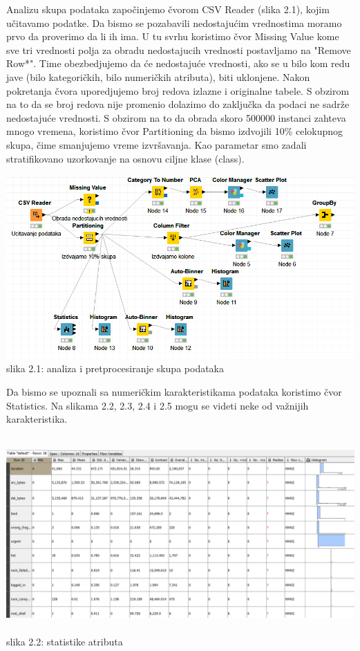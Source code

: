 \documentclass[10pt]{article}
\begin{document}
Analizu skupa podataka zapo\v cinjemo \v cvorom CSV Reader (slika 2.1), kojim u\v citavamo podatke. Da bismo se pozabavili nedostaju\' cim vrednostima moramo prvo da proverimo da li ih ima. U tu svrhu koristimo \v cvor Missing Value kome sve tri vrednosti polja za obradu nedostajucih vrednosti postavljamo na "Remove Row*". Time obezbedjujemo da \'ce nedostaju\' ce vrednosti, ako se u bilo kom redu jave (bilo kategori\v ckih, bilo numeri\v ckih atributa), biti uklonjene. Nakon pokretanja \v cvora uporedjujemo broj redova izlazne i originalne tabele. S obzirom na to da se broj redova nije promenio dolazimo do zaklju\v cka da podaci ne sadr\v ze nedostaju\' ce vrednosti.
S obzirom na to da obrada skoro 500000 instanci zahteva mnogo vremena, koristimo \v cvor Partitioning da bismo izdvojili 10\% celokupnog skupa, \v cime smanjujemo vreme izvr\v savanja. Kao parametar smo zadali stratifikovano uzorkovanje na osnovu ciljne klase (class).

\begin{center}
\includegraphics[width = \textwidth]{slika1}
slika 2.1: analiza i pretprocesiranje skupa podataka\\
\end{center}

Da bismo se upoznali sa numeri\v ckim karakteristikama podataka koristimo \v cvor Statistics. Na slikama 2.2, 2.3, 2.4 i 2.5 mogu se videti neke od va\v znijih karakteristika.

\begin{center}
\includegraphics[width = \textwidth, height = 7.5cm]{slika2}
slika 2.2: statistike atributa\\
\end{center}
\end{document}
